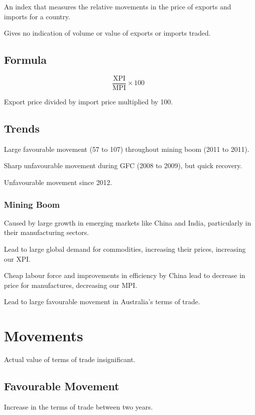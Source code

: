 \documentclass[a4paper,11pt]{article}
\begin{document}
An index that measures the relative movements in the price of exports and
imports for a country.

Gives no indication of volume or value of exports or imports traded.


\subsection{Formula}

$$
\frac{\text{XPI}}{\text{MPI}} \times 100
$$

Export price divided by import price multiplied by 100.


\subsection{Trends}

Large favourable movement (57 to 107) throughout mining boom (2011 to 2011).

Sharp unfavourable movement during GFC (2008 to 2009), but quick recovery.

Unfavourable movement since 2012.


\subsubsection{Mining Boom}

Caused by large growth in emerging markets like China and India, particularly
in their manufacturing sectors.

Lead to large global demand for commodities, increasing their prices,
increasing our XPI.

Cheap labour force and improvements in efficiency by China lead to decrease in
price for manufactures, decreasing our MPI.

Lead to large favourable movement in Australia's terms of trade.




\section{Movements}

Actual value of terms of trade insignificant.


\subsection{Favourable Movement}

Increase in the terms of trade between two years.
\end{document}
